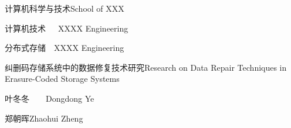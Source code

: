 
\school
{计算机科学与技术}{School of XXX}

\major
{计算机技术~~~}{XXXX Engineering}

\direct
{分布式存储~~}{XXXX Engineering}

\thesistitle
{纠删码存储系统中的数据修复技术研究}{Research on Data Repair Techniques in Erasure-Coded Storage Systems}

\thesisauthor
{叶冬冬~~~~}{Dongdong Ye}

\teacher
{郑朝晖}{Zhaohui Zheng}





